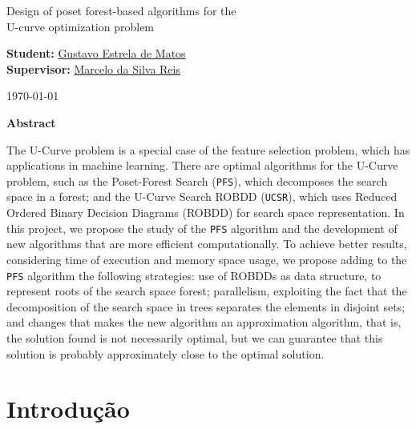 \documentclass[12pt]{article}
\begin{document}
\begin{center}
    {\LARGE Design of poset forest-based algorithms for the\\
        \bigskip 
        U-curve optimization problem}

    \bigskip        

    {\large {\bf Student:} \href{mailto:gustavo.estrela.matos@usp.br}
        {Gustavo Estrela de Matos}\\ 
    {\bf Supervisor:} \href{mailto:marcelo.reis@butantan.gov.br}
        {Marcelo da Silva Reis}\\

    \bigskip

    \today\\
    }

    \bigskip
    \bigskip

    {\bf Abstract}    
\end{center}
The U-Curve problem is a special case of the feature selection problem,
which has applications in machine learning. There are optimal algorithms
for the U-Curve problem, such as the Poset-Forest Search ({\tt PFS}), 
which decomposes the search space in a forest; and the U-Curve Search
ROBDD ({\tt UCSR}), which uses Reduced Ordered Binary Decision Diagrams
(ROBDD) for search space representation. In this project, we propose
the study of the {\tt PFS} algorithm and the development of new 
algorithms that are more efficient computationally. To achieve better 
results, considering time of execution and memory space usage, we 
propose adding to the {\tt PFS} algorithm the following strategies: use
of ROBDDs as data structure, to represent roots of the search space 
forest; parallelism, exploiting the fact that the decomposition of the 
search space in trees separates the elements in disjoint sets; and 
changes that makes the new algorithm an approximation algorithm, that 
is, the solution found is not necessarily optimal, but we can guarantee
that this solution is probably approximately close to the optimal 
solution.

    
\newpage
\tableofcontents
\newpage

\section{Introdução}
% 
\end{document}
